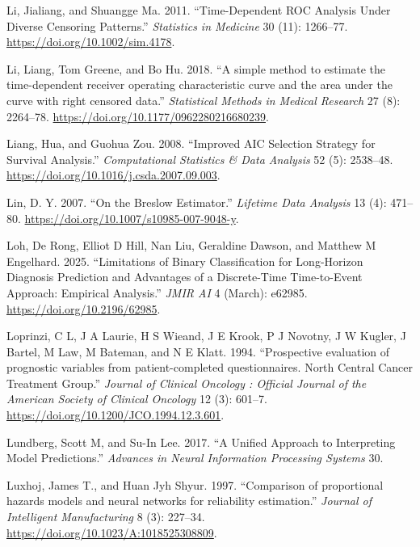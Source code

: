 \documentclass[
  letterpaper,
  krantz2]{style/krantz}
\newlength{\cslhangindent}
\newenvironment{CSLReferences}[2] %
 {\begin{list}{}{%
  \setlength{\itemindent}{0pt}
  \setlength{\leftmargin}{0pt}
  \setlength{\parsep}{0pt}
  \ifodd #1
   \setlength{\leftmargin}{\cslhangindent}
   \setlength{\itemindent}{-1\cslhangindent}
  \fi
  \setlength{\itemsep}{#2\baselineskip}}}
 {\end{list}}
\begin{document}
\begin{CSLReferences}{1}{0}
Li, Jialiang, and Shuangge Ma. 2011. {``Time-Dependent ROC Analysis
Under Diverse Censoring Patterns.''} \emph{Statistics in Medicine} 30
(11): 1266--77. \url{https://doi.org/10.1002/sim.4178}.

Li, Liang, Tom Greene, and Bo Hu. 2018. {``{A simple method to estimate
the time-dependent receiver operating characteristic curve and the area
under the curve with right censored data}.''} \emph{Statistical Methods
in Medical Research} 27 (8): 2264--78.
\url{https://doi.org/10.1177/0962280216680239}.

Liang, Hua, and Guohua Zou. 2008. {``{Improved AIC Selection Strategy
for Survival Analysis}.''} \emph{Computational Statistics \& Data
Analysis} 52 (5): 2538--48.
\url{https://doi.org/10.1016/j.csda.2007.09.003}.

Lin, D. Y. 2007. {``On the {Breslow} Estimator.''} \emph{Lifetime Data
Analysis} 13 (4): 471--80.
\url{https://doi.org/10.1007/s10985-007-9048-y}.

Loh, De Rong, Elliot D Hill, Nan Liu, Geraldine Dawson, and Matthew M
Engelhard. 2025. {``Limitations of Binary Classification for
Long-Horizon Diagnosis Prediction and Advantages of a Discrete-Time
Time-to-Event Approach: Empirical Analysis.''} \emph{JMIR AI} 4 (March):
e62985. \url{https://doi.org/10.2196/62985}.

Loprinzi, C L, J A Laurie, H S Wieand, J E Krook, P J Novotny, J W
Kugler, J Bartel, M Law, M Bateman, and N E Klatt. 1994. {``{Prospective
evaluation of prognostic variables from patient-completed
questionnaires. North Central Cancer Treatment Group.}''} \emph{Journal
of Clinical Oncology : Official Journal of the American Society of
Clinical Oncology} 12 (3): 601--7.
\url{https://doi.org/10.1200/JCO.1994.12.3.601}.

Lundberg, Scott M, and Su-In Lee. 2017. {``{A Unified Approach to
Interpreting Model Predictions}.''} \emph{Advances in Neural Information
Processing Systems} 30.

Luxhoj, James T., and Huan Jyh Shyur. 1997. {``{Comparison of
proportional hazards models and neural networks for reliability
estimation}.''} \emph{Journal of Intelligent Manufacturing} 8 (3):
227--34. \url{https://doi.org/10.1023/A:1018525308809}.


\end{CSLReferences}
\end{document}
